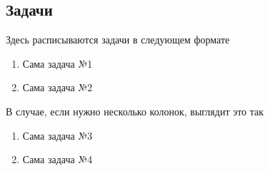 \subsection{Задачи}

	Здесь расписываются задачи в следующем формате

	\begin{enumerate}
		\setcounter{enumi}{\value{tasks}}

		\item Сама задача №1		%
		\item Сама задача №2		%

		\setcounter{tasks}{\value{enumi}}
	\end{enumerate}

	В случае, если нужно несколько колонок, выглядит это так

	\begin{multicols}{2}
		\begin{enumerate}
			\setcounter{enumi}{\value{tasks}}

			\item Сама задача №3	%
			\item Сама задача №4	%

			\setcounter{tasks}{\value{enumi}}
		\end{enumerate}
	\end{multicols}